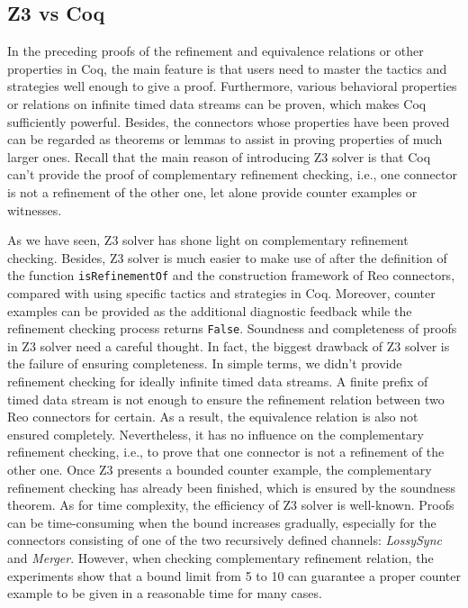 \documentclass[preprint,3p]{elsarticle}
\begin{document}
\subsection{Z3 vs Coq}
In the preceding proofs of the refinement and equivalence relations or other properties in Coq, the main feature is that users need to master the tactics and strategies well enough to give a proof. Furthermore, various behavioral properties or relations on infinite timed data streams can be proven, which makes Coq sufficiently powerful. Besides, the connectors whose properties have been proved can be regarded as theorems or lemmas to assist in proving properties of much larger ones. Recall that the main reason of introducing Z3 solver is that Coq can't provide the proof of complementary refinement checking, i.e., one connector is not a refinement of the other one, let alone provide counter examples or witnesses.

As we have seen, Z3 solver has shone light on complementary refinement checking. Besides, Z3 solver is much easier to make use of after the definition of the function \texttt{isRefinementOf} and the construction framework of Reo connectors, compared with using specific tactics and strategies in Coq. Moreover, counter examples can be provided as the additional diagnostic feedback while the refinement checking process returns \texttt{False}.
Soundness and completeness of proofs in Z3 solver need a careful thought. In fact, the biggest drawback of Z3 solver is the failure of ensuring completeness. In simple terms, we didn't provide refinement checking for ideally infinite timed data streams. A finite prefix of timed data stream is not enough to ensure the refinement relation between two Reo connectors for certain. As a result, the equivalence relation is also not ensured completely. Nevertheless, it has no influence on the complementary refinement checking, i.e., to prove that one connector is not a refinement of the other one. Once Z3 presents a bounded counter example, the complementary refinement checking has already been finished, which is ensured by the soundness theorem.
As for time complexity, the efficiency of Z3 solver is well-known. Proofs can be time-consuming when the bound increases gradually, especially for the connectors consisting of one of the two recursively defined channels: \emph{LossySync} and \emph{Merger}. However, when checking complementary refinement relation, the experiments show that a bound limit from 5 to 10 can guarantee a proper counter example to be given in a reasonable time for many cases.
\end{document}

